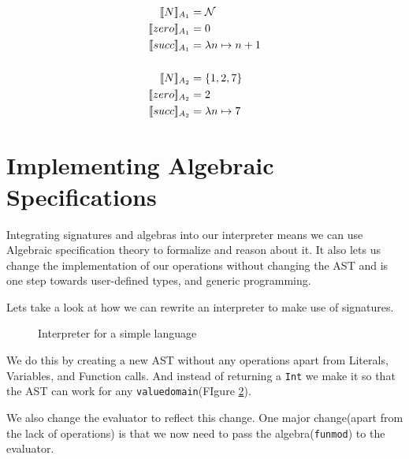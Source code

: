 \begin{align*}
    \alg{N}{A_1} &= \mathcal{N}\\
    \alg{zero}{A_1} &= 0\\
    \alg{succ}{A_1} &= \lambda n \mapsto n + 1\\
    &{}\\
    \alg{N}{A_2} &= \{1,2,7\}\\
    \alg{zero}{A_2} &= 2\\
    \alg{succ}{A_2} &= \lambda n \mapsto 7\\
\end{align*}



\section{Implementing Algebraic Specifications}
Integrating signatures and algebras into our interpreter means we can use Algebraic specification theory to formalize and reason about it.
It also lets us change the implementation of our operations without changing the AST and is one step towards user-defined types, and generic programming.

Lets take a look at how we can rewrite an interpreter to make use of signatures.

\begin{figure}[H]
    
    \label{fig:astx}
    \caption{Interpreter for a simple language}
\end{figure}

We do this by creating a new AST without any operations apart from Literals, Variables, and Function calls.
And instead of returning a \texttt{Int} we make it so that the AST can work for any \texttt{valuedomain}(FIgure \ref{fig:ast2}).

\begin{figure}[H]
    
    \label{fig:ast2}
\end{figure}

We also change the evaluator to reflect this change. One major change(apart from the lack of operations) is that we now need to pass the algebra(\texttt{funmod}) to the evaluator.

\begin{figure}[H]
    
    \label{fig:eval}
\end{figure}


